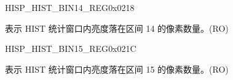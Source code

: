 \begin{register}{H}{ISP\_HIST\_BIN14\_REG}{0x0218}\label{regdesc:ISPHISTBIN14REG}
%
%
\regnewline%
\begin{regdesc}\begin{reglist}
\label{fielddesc:ISPHISTBIN14}\item [ISP\_HIST\_BIN\_14] 表示 HIST 统计窗口内亮度落在区间 14 的像素数量。(RO)
\end{reglist}\end{regdesc}
\end{register}


\begin{register}{H}{ISP\_HIST\_BIN15\_REG}{0x021C}\label{regdesc:ISPHISTBIN15REG}
%
%
\regnewline%
\begin{regdesc}\begin{reglist}
\label{fielddesc:ISPHISTBIN15}\item [ISP\_HIST\_BIN\_15] 表示 HIST 统计窗口内亮度落在区间 15 的像素数量。(RO)
\end{reglist}\end{regdesc}
\end{register}



